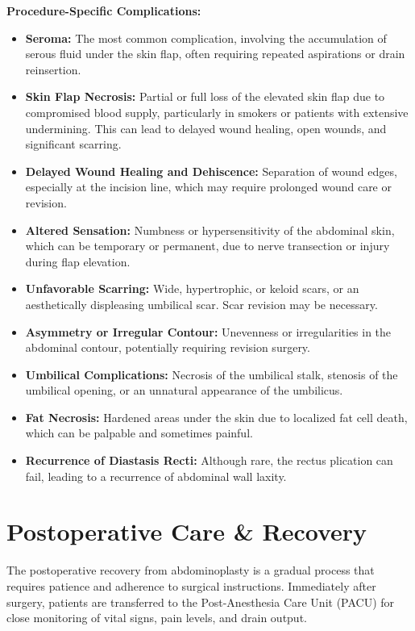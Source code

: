 \textbf{Procedure-Specific Complications:}
\begin{itemize}
  \item \textbf{Seroma:} The most common complication, involving the accumulation of serous fluid under the skin flap, often requiring repeated aspirations or drain reinsertion.
  \item \textbf{Skin Flap Necrosis:} Partial or full loss of the elevated skin flap due to compromised blood supply, particularly in smokers or patients with extensive undermining. This can lead to delayed wound healing, open wounds, and significant scarring.
  \item \textbf{Delayed Wound Healing and Dehiscence:} Separation of wound edges, especially at the incision line, which may require prolonged wound care or revision.
  \item \textbf{Altered Sensation:} Numbness or hypersensitivity of the abdominal skin, which can be temporary or permanent, due to nerve transection or injury during flap elevation.
  \item \textbf{Unfavorable Scarring:} Wide, hypertrophic, or keloid scars, or an aesthetically displeasing umbilical scar. Scar revision may be necessary.
  \item \textbf{Asymmetry or Irregular Contour:} Unevenness or irregularities in the abdominal contour, potentially requiring revision surgery.
  \item \textbf{Umbilical Complications:} Necrosis of the umbilical stalk, stenosis of the umbilical opening, or an unnatural appearance of the umbilicus.
  \item \textbf{Fat Necrosis:} Hardened areas under the skin due to localized fat cell death, which can be palpable and sometimes painful.
  \item \textbf{Recurrence of Diastasis Recti:} Although rare, the rectus plication can fail, leading to a recurrence of abdominal wall laxity.
\end{itemize}

\section*{Postoperative Care \& Recovery}
The postoperative recovery from abdominoplasty is a gradual process that requires patience and adherence to surgical instructions. Immediately after surgery, patients are transferred to the Post-Anesthesia Care Unit (PACU) for close monitoring of vital signs, pain levels, and drain output.

